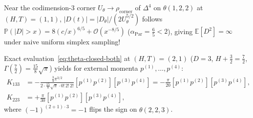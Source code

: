 \begin{example}[Pareto $\alpha_{\mathrm{Par}} = 6/5$ Monte Carlo trap and $5\mathrm{D}$ CS $\theta(1,3,3), \theta(2,2,3)$ evaluation]
\label{ex:pareto-and-5d-theta}
Near the codimension-$3$ corner $U_\theta \to \rho_{\mathrm{corner}}$ of $\Delta^4$ on $\theta(1,2,2)$ at $(H,T)=(1,1)$, $|D(t)| = |D_\theta|/(2U_\theta^{5/2})$ follows $\mathbb{P}(|D| > x) = 8(c/x)^{6/5} + \mathcal{O}(x^{-8/5})$ ($\alpha_{\mathrm{Par}} = \frac{6}{5} < 2$), giving $\mathbb{E}[D^2] = \infty$ under naive uniform simplex sampling!

Exact evaluation~\eqref{eq:theta-closed-both} at $(H,T) = (2,1)$ ($D=3$, $H+\frac{3}{2} = \frac{7}{2}$, $\Gamma(\frac{7}{2}) = \frac{15}{8}\sqrt{\pi}$) yields for external momenta $p^{(1)},\dots,p^{(4)}$:
\[
\begin{aligned}
K_{133} &= -\frac{\frac{3}{4}\pi^{3/2}}{2\cdot\frac{15}{8}\sqrt{\pi}\cdot 0!\,2!\,2!}[p^{(1)}p^{(2)}][p^{(3)}p^{(4)}] = -\frac{\pi}{20}[p^{(1)}p^{(2)}][p^{(3)}p^{(4)}],\\
K_{223} &= +\frac{\pi}{30}[p^{(1)}p^{(2)}][p^{(3)}p^{(4)}],
\end{aligned}
\]
where $(-1)^{(2+1)\cdot 3} = -1$ flips the sign on $\theta(2,2,3)$.
\end{example}

